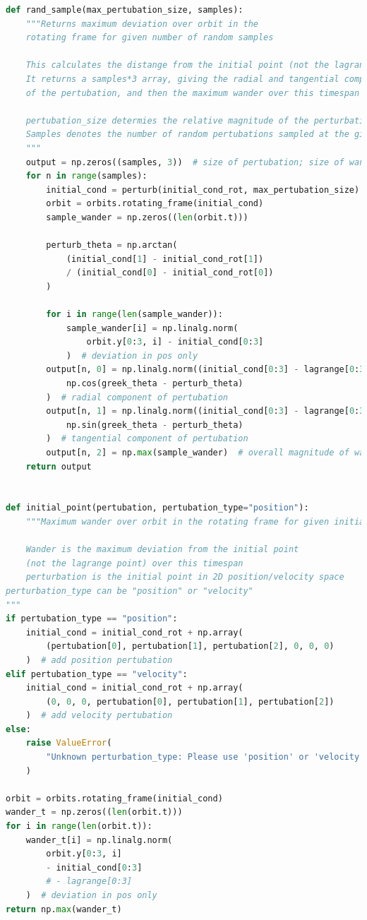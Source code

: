 \documentclass[11pt, a4paper,twocolumn]{article} %
\begin{document}
\begin{appendices}
\begin{lstlisting}[language=Python]
def rand_sample(max_pertubation_size, samples):
	"""Returns maximum deviation over orbit in the 
	rotating frame for given number of random samples
	
	This calculates the distange from the initial point (not the lagrange point)
	It returns a samples*3 array, giving the radial and tangential components
	of the pertubation, and then the maximum wander over this timespan
	
	pertubation_size determies the relative magnitude of the perturbation
	Samples denotes the number of random pertubations sampled at the given size
	"""
	output = np.zeros((samples, 3))  # size of pertubation; size of wander
	for n in range(samples):
		initial_cond = perturb(initial_cond_rot, max_pertubation_size)
		orbit = orbits.rotating_frame(initial_cond)
		sample_wander = np.zeros((len(orbit.t)))
		
		perturb_theta = np.arctan(
			(initial_cond[1] - initial_cond_rot[1])
			/ (initial_cond[0] - initial_cond_rot[0])
		)
		
		for i in range(len(sample_wander)):
			sample_wander[i] = np.linalg.norm(
				orbit.y[0:3, i] - initial_cond[0:3]
			)  # deviation in pos only
		output[n, 0] = np.linalg.norm((initial_cond[0:3] - lagrange[0:3])) * np.abs(
			np.cos(greek_theta - perturb_theta)
		)  # radial component of pertubation
		output[n, 1] = np.linalg.norm((initial_cond[0:3] - lagrange[0:3])) * np.abs(
			np.sin(greek_theta - perturb_theta)
		)  # tangential component of pertubation
		output[n, 2] = np.max(sample_wander)  # overall magnitude of wander
	return output


def initial_point(pertubation, pertubation_type="position"):
	"""Maximum wander over orbit in the rotating frame for given initial point 
	
	Wander is the maximum deviation from the initial point 
	(not the lagrange point) over this timespan
	perturbation is the initial point in 2D position/velocity space
perturbation_type can be "position" or "velocity" 
"""
if pertubation_type == "position":
	initial_cond = initial_cond_rot + np.array(
		(pertubation[0], pertubation[1], pertubation[2], 0, 0, 0)
	)  # add position pertubation
elif pertubation_type == "velocity":
	initial_cond = initial_cond_rot + np.array(
		(0, 0, 0, pertubation[0], pertubation[1], pertubation[2])
	)  # add velocity pertubation
else:
	raise ValueError(
		"Unknown perturbation_type: Please use 'position' or 'velocity'"
	)

orbit = orbits.rotating_frame(initial_cond)
wander_t = np.zeros((len(orbit.t)))
for i in range(len(orbit.t)):
	wander_t[i] = np.linalg.norm(
		orbit.y[0:3, i]
		- initial_cond[0:3]
		# - lagrange[0:3]
	)  # deviation in pos only
return np.max(wander_t)

\end{lstlisting}

\end{appendices}


\restoregeometry
\end{document}
